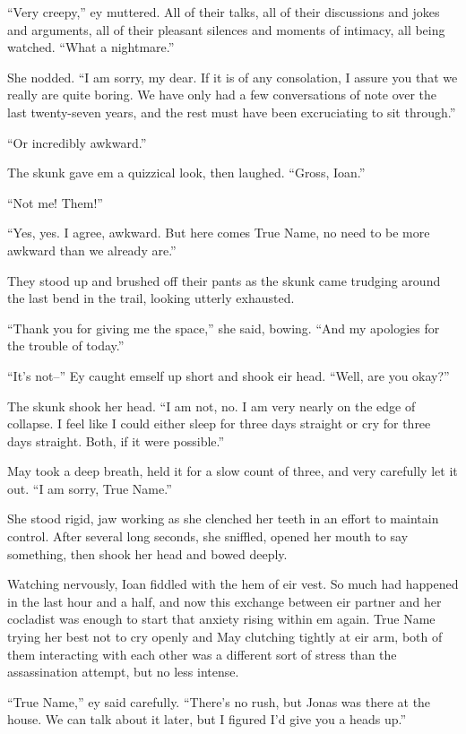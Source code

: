 ``Very creepy,'' ey muttered. All of their talks, all of their discussions and jokes and arguments, all of their pleasant silences and moments of intimacy, all being watched. ``What a nightmare.''

She nodded. ``I am sorry, my dear. If it is of any consolation, I assure you that we really are quite boring. We have only had a few conversations of note over the last twenty-seven years, and the rest must have been excruciating to sit through.''

``Or incredibly awkward.''

The skunk gave em a quizzical look, then laughed. ``Gross, Ioan.''

``Not me! Them!''

``Yes, yes. I agree, awkward. But here comes True Name, no need to be more awkward than we already are.''

They stood up and brushed off their pants as the skunk came trudging around the last bend in the trail, looking utterly exhausted.

``Thank you for giving me the space,'' she said, bowing. ``And my apologies for the trouble of today.''

``It's not--'' Ey caught emself up short and shook eir head. ``Well, are you okay?''

The skunk shook her head. ``I am not, no. I am very nearly on the edge of collapse. I feel like I could either sleep for three days straight or cry for three days straight. Both, if it were possible.''

May took a deep breath, held it for a slow count of three, and very carefully let it out. ``I am sorry, True Name.''

She stood rigid, jaw working as she clenched her teeth in an effort to maintain control. After several long seconds, she sniffled, opened her mouth to say something, then shook her head and bowed deeply.

Watching nervously, Ioan fiddled with the hem of eir vest. So much had happened in the last hour and a half, and now this exchange between eir partner and her cocladist was enough to start that anxiety rising within em again. True Name trying her best not to cry openly and May clutching tightly at eir arm, both of them interacting with each other was a different sort of stress than the assassination attempt, but no less intense.

``True Name,'' ey said carefully. ``There's no rush, but Jonas was there at the house. We can talk about it later, but I figured I'd give you a heads up.''

